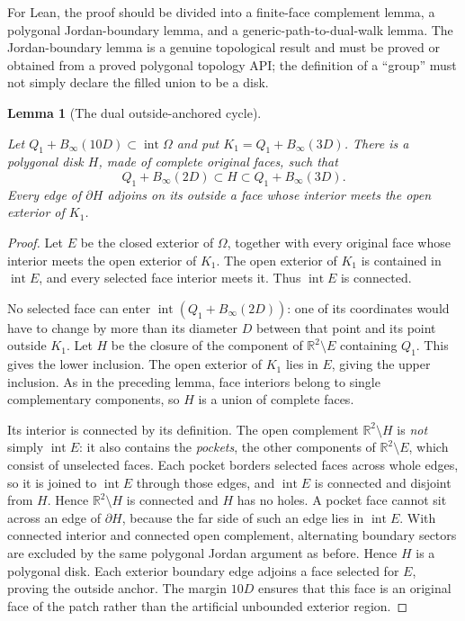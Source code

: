 \documentclass[11pt,a4paper]{article}
\newtheorem{lemma}[definition]{Lemma}
\theoremstyle{remark}
\newcommand{\lean}[1]{}
\newcommand{\uses}[1]{}
\begin{document}
For Lean, the proof should be divided into a finite-face complement lemma,
a polygonal Jordan-boundary lemma, and a generic-path-to-dual-walk lemma.
The Jordan-boundary lemma is a genuine topological result and must be proved
or obtained from a proved polygonal topology API; the definition of a
``group'' must not simply declare the filled union to be a disk.

\begin{lemma}[The dual outside-anchored cycle]
\label{lem:outside-grouping}
\lean{Tilings.Geometry.outsideAnchoredGrouping}
\uses{def:mesh,lem:regular-grouping}
Let $Q_1+B_\infty(10D)\subset\operatorname{int}\Omega$ and put
$K_1=Q_1+B_\infty(3D)$.  There is a polygonal disk $H$, made of complete
original faces, such that
\[
 Q_1+B_\infty(2D)\subset H\subset Q_1+B_\infty(3D).
\]
Every edge of $\partial H$ adjoins on its outside a face whose interior
meets the open exterior of $K_1$.
\end{lemma}

\begin{proof}
Let $E$ be the closed exterior of $\Omega$, together with every original
face whose interior meets the open exterior of $K_1$.  The open exterior
of $K_1$ is contained in $\operatorname{int}E$, and every selected face
interior meets it.  Thus $\operatorname{int}E$ is connected.

No selected face can enter $\operatorname{int}(Q_1+B_\infty(2D))$:
one of its coordinates would have to change by more than its diameter $D$
between that point and its point outside $K_1$.  Let $H$ be the closure of
the component of $\mathbb R^2\setminus E$ containing $Q_1$.  This gives
the lower inclusion.  The open exterior of $K_1$ lies in $E$, giving the
upper inclusion.  As in the preceding lemma, face interiors belong to
single complementary components, so $H$ is a union of complete faces.

Its interior is connected by its definition.  The open complement
$\mathbb R^2\setminus H$ is \emph{not} simply $\operatorname{int}E$: it
also contains the \emph{pockets}, the other components of
$\mathbb R^2\setminus E$, which consist of unselected faces.  Each pocket
borders selected faces across whole edges, so it is joined to
$\operatorname{int}E$ through those edges, and $\operatorname{int}E$ is
connected and disjoint from $H$.  Hence $\mathbb R^2\setminus H$ is
connected and $H$ has no holes.  A pocket face cannot sit across an edge
of $\partial H$, because the far side of such an edge lies in
$\operatorname{int}E$.  With connected interior and connected open
complement, alternating boundary sectors are excluded by the same
polygonal Jordan argument as before.  Hence $H$ is a polygonal disk.  Each exterior
boundary edge adjoins a face selected for $E$, proving the outside anchor.
The margin $10D$ ensures that this face is an original face of the patch
rather than the artificial unbounded exterior region.
\end{proof}
\end{document}
